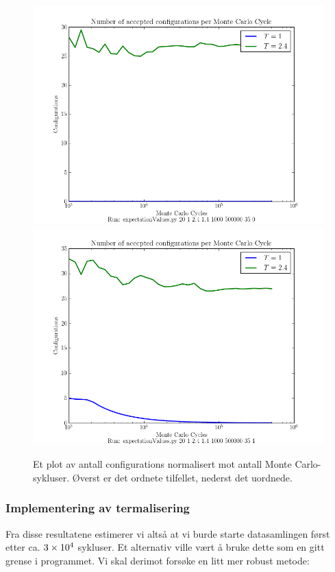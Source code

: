 \documentclass[11pt]{article}
\begin{document}
\begin{figure}[ht]
  \centering
  \includegraphics[scale=0.7]{../fig/configurations.png}
  \includegraphics[scale=0.7]{../fig/configurations_random.png}
  \caption{\label{fig:configurations} Et plot av antall configurations
normalisert mot antall Monte Carlo-sykluser. Øverst er det ordnete tilfellet, nederst det uordnede.}
\end{figure}

\subsubsection{Implementering av termalisering}
\label{subsec:implementering-av-termalisering}
Fra disse resultatene estimerer vi altså at vi burde starte
datasamlingen først etter ca. $3\times 10^{4}$ sykluser. Et alternativ ville vært å bruke
dette som en gitt grense i programmet. Vi skal derimot forsøke en litt
mer robust metode:
\end{document}
